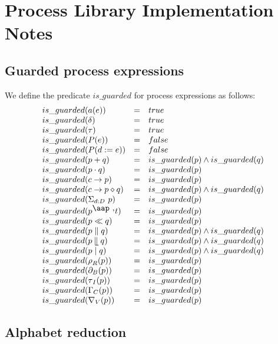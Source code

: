 \documentclass{article}
\begin{document}
\section{Process Library Implementation Notes}

\subsection{Guarded process expressions}

We define the predicate $is\_guarded$ for process expressions as follows:%
\[
\begin{array}{lll}
is\_guarded(a(e)) & = & true \\ 
is\_guarded(\delta ) & = & true \\ 
is\_guarded(\tau ) & = & true \\ 
is\_guarded(P(e)) & = & false \\ 
is\_guarded(P(d:=e)) & = & false \\ 
is\_guarded(p+q) & = & is\_guarded(p)\wedge is\_guarded(q) \\ 
is\_guarded(p\cdot q) & = & is\_guarded(p) \\ 
is\_guarded(c\rightarrow p) & = & is\_guarded(p) \\ 
is\_guarded(c\rightarrow p\diamond q) & = & is\_guarded(p)\wedge
is\_guarded(q) \\ 
is\_guarded(\Sigma _{d:D}\ p) & = & is\_guarded(p) \\ 
is\_guarded(p^{\mathbin{\mbox{\aap ,}}}t) & = & is\_guarded(p) \\ 
is\_guarded(p\ll q) & = & is\_guarded(p) \\ 
is\_guarded(p\parallel q) & = & is\_guarded(p)\wedge is\_guarded(q) \\ 
is\_guarded(p\mathbin{\mathrel{\llfloor}}q) & = & is\_guarded(p)\wedge
is\_guarded(q) \\ 
is\_guarded(p\mid q) & = & is\_guarded(p)\wedge is\_guarded(q) \\ 
is\_guarded(\rho _{R}(p)) & = & is\_guarded(p) \\ 
is\_guarded(\partial _{B}(p)) & = & is\_guarded(p) \\ 
is\_guarded(\tau _{I}(p)) & = & is\_guarded(p) \\ 
is\_guarded(\Gamma _{C}(p)) & = & is\_guarded(p) \\ 
is\_guarded(\nabla _{V}(p)) & = & is\_guarded(p)%
\end{array}%
\]%
\newpage 

\subsection{Alphabet reduction}
\end{document}
